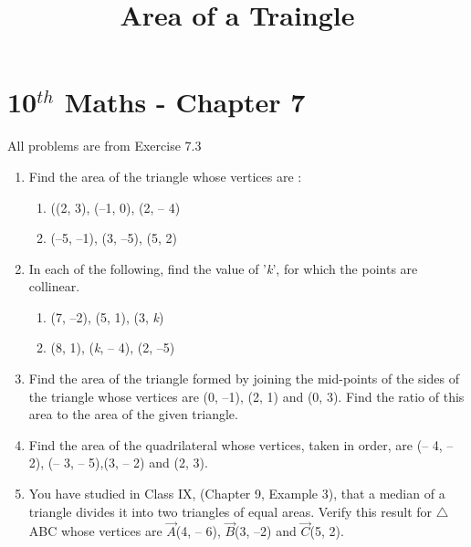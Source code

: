 \documentclass[12pt]{article}
\begin{document}
\begin{center}
\title{\textbf{Area of a Traingle}}
\date{\vspace{-5ex}} %
\maketitle
\end{center}

\setcounter{page}{1}

\section{10$^{th}$ Maths - Chapter 7}

All problems are from Exercise 7.3

\begin{enumerate}
\item Find the area of the triangle whose vertices are :
\begin{enumerate}
\item ((2, 3), (–1, 0), (2, – 4)
\item (–5, –1), (3, –5), (5, 2) 
\end{enumerate}

\item In each of the following, find the value of '\textit{k}', for which the points are collinear.
\begin{enumerate}
\item (7, –2), (5, 1), (3, \textit{k})
\item (8, 1), (\textit{k}, – 4), (2, –5) 
\end{enumerate}

\item Find the area of the triangle formed by joining the mid-points of the sides of the triangle whose vertices are (0, –1), (2, 1) and (0, 3). Find the ratio of this area to the area of the given triangle.

\item Find the area of the quadrilateral whose vertices, taken in order, are (– 4, – 2), (– 3, – 5),(3, – 2) and (2, 3).

\item You have studied in Class IX, (Chapter 9, Example 3), that a median of a triangle divides it into two triangles of equal areas. Verify this result for $\triangle$ABC whose vertices are $\vec{A}$(4, – 6), $\vec{B}$(3, –2) and $\vec{C}$(5, 2). 

\end{enumerate}
\end{document}
